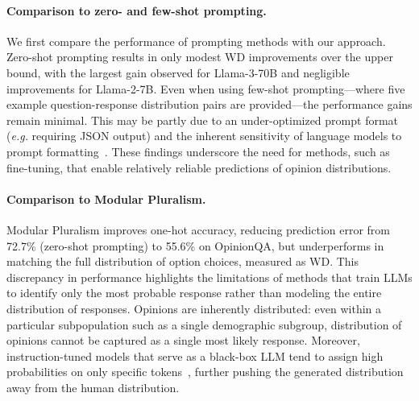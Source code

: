 \paragraph{Comparison to zero- and few-shot prompting.}
We first compare the performance of prompting methods with our approach. Zero-shot prompting results in only modest WD improvements over the upper bound, with the largest gain observed for Llama-3-70B and negligible improvements for Llama-2-7B. 
Even when using few-shot prompting---where five example question-response distribution pairs are provided---the performance gains remain minimal. 
This may be partly due to an under-optimized prompt format (\textit{e.g.} requiring JSON output) and the inherent sensitivity of language models to prompt formatting~\cite{sclar2023quantifying, anagnostidis2024susceptible}. 
These findings underscore the need for methods, such as fine-tuning, that enable relatively reliable predictions of opinion distributions.


\paragraph{Comparison to Modular Pluralism.}
Modular Pluralism improves one-hot accuracy, reducing prediction error from 72.7\% (zero-shot prompting) to 55.6\% on OpinionQA, but underperforms in matching the full distribution of option choices, measured as WD.
This discrepancy in performance highlights the limitations of methods that train LLMs to identify only the most probable response rather than modeling the entire distribution of responses.
Opinions are inherently distributed: even within a particular subpopulation such as a single demographic subgroup, distribution of opinions cannot be captured as a single most likely response.
Moreover, instruction-tuned models that serve as a black-box LLM tend to assign high probabilities on only specific tokens~\cite{lin2022teaching, kadavath2022language, achiam2023gpt}, further pushing the generated distribution away from the human distribution.

